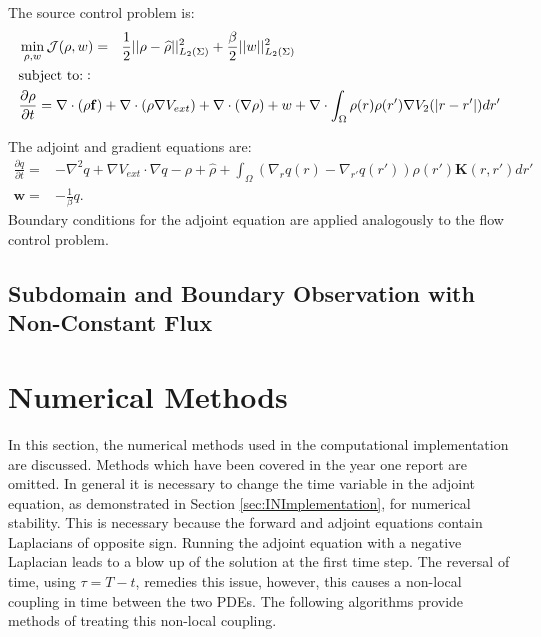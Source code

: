 \documentclass[11pt, a4paper]{article}
\theoremstyle{definition}
\newcommand{\Sta}{\rho}
\newcommand{\Adjb}{q}
\newcommand{\Con}{\mathbf{f}}
\begin{document}
The source control problem is:
\begin{align}
\label{eqn:AdvDiffLinear}
&\min_{\Sta,{w} } \mathcal J(\Sta,{w}) = \ \ \frac{1}{2}||\Sta - \widehat \Sta||_{L_2(\Sigma)}^2  +\frac{\beta}{2}||{w}||_{L_2(\Sigma)}^2\\
& \text{subject to:}: \notag \\
&\frac{\partial \Sta}{\partial  t} = \nabla \cdot (\Sta\Con) + \nabla \cdot (\rho\nabla V_{ext}) + \nabla \cdot (\nabla \rho) + w \notag +\nabla \cdot \int_\Omega \Sta(r)\Sta(r') \nabla V_2(|r-r'|)dr' \notag
\end{align}

The adjoint and gradient equations are:
\begin{align*}
\frac{\partial \Adjb}{\partial t} =& - \nabla^2 \Adjb + \nabla V_{ext} \cdot \nabla \Adjb - \Sta + \widehat \rho +\int_\Omega (\nabla_r \Adjb(r) - \nabla_{r'} \Adjb(r') ) \rho(r') \mathbf{K}(r,r') dr'\\
\mathbf{w} =& - \frac{1}{\beta} \Adjb.
\end{align*}
Boundary conditions for the adjoint equation are applied analogously to the flow control problem.

\subsection{Subdomain and Boundary Observation with Non-Constant Flux}


\section{Numerical Methods} \label{sec:NumericalMethods}
In this section, the numerical methods used in the computational implementation are discussed. Methods which have been covered in the year one report are omitted.
In general it is necessary to change the time variable in the adjoint equation, as demonstrated in Section \ref{sec:INImplementation}, for numerical stability. This is necessary because the forward and adjoint equations contain Laplacians of opposite sign. Running the adjoint equation with a negative Laplacian leads to a blow up of the solution at the first time step. The reversal of time, using $\tau = T-t$, remedies this issue, however, this causes a non-local coupling in time between the two PDEs.
The following algorithms provide methods of treating this non-local coupling.
\end{document}
